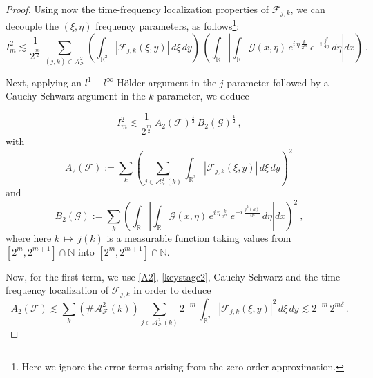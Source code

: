 \documentclass[a4paper,reqno]{amsart}
\numberwithin{equation}{section}
\theoremstyle{definition}
\newcommand{\R}{\mathbb{R}}
\newcommand{\N}{\mathbb{N}}
\def\F{\mathcal{F}}
\def\G{\mathcal{G}}
\def\A{\mathcal{A}}
\def\d{\delta}
\begin{document}
\begin{proof}
Using now the time-frequency localization properties of $\F_{j,k}$, we can decouple the $(\xi, \eta)$ frequency parameters, as follows\footnote{Here we ignore the error terms arising from the zero-order approximation.}:
\begin{equation}\label{reduct21}
	I_m^2\lesssim \frac{1}{2^{\frac{m}{2}}}\,\sum_{(j,k)\in \A_{\F}^{2}}\left(\int_{\R^2} \left|\F_{j,k}(\xi,y)\right| \,d\xi\,dy\right)\,\left(\int_{\R}\left|\int_{\R}\G(x,\eta)\,e^{i\,\eta\,\frac{k}{2^m}}\,e^{-i\,\frac{j^2}{4 \eta}}\,d\eta\right| dx\right)\:.
\end{equation}

Next, applying an $l^1-l^{\infty}$ H\"older argument in the $j$-parameter followed by a Cauchy-Schwarz argument in the $k$-parameter, we deduce

\begin{equation}\label{reduct211}
	I_m^2\lesssim \frac{1}{2^{\frac{m}{2}}}\,A_2(\F)^{\frac{1}{2}}\,B_2(\G)^{\frac{1}{2}}\,,
\end{equation}
with
\begin{equation}\label{reduct2a}
A_2(\F):=\sum_k \left(\sum_{j\in \A_{\F}^{2}(k)}\int_{\R^2} \left|\F_{j,k}(\xi,y)\right| \,d\xi\,dy\right)^2\,
\end{equation}
and
\begin{equation}\label{reduct2b}
B_2(\G):=\sum_k \left(\int_{\R}\left|\int_{\R}\G(x,\eta)\,e^{i\,\eta\,\frac{k}{2^m}}\,e^{-i\,\frac{j^2(k)}{4 \eta}}\,d\eta\right| dx \right)^2\:,
\end{equation}
where here $k\,\mapsto\,j(k)$ is a measurable function taking values from $[2^m,2^{m+1}]\cap \N$ into $[2^m,2^{m+1}]\cap \N$.

Now, for the first term, we use \eqref{A2}, \eqref{keystage2}, Cauchy-Schwarz and the time-frequency localization of $\F_{j,k}$ in order to deduce
\begin{equation}\label{reduct2a1}
A_2(\F)\lesssim \sum_k \left(\# \A_{\F}^{2}(k)\right) \sum_{j\in \A_{\F}^{2}(k)}2^{-m}\,\int_{\R^2} \left|\F_{j,k}(\xi,y)\right|^2 \,d\xi\,dy\lesssim 2^{-m}\,2^{m \d}\,.
\end{equation}


\end{proof}
\end{document}
